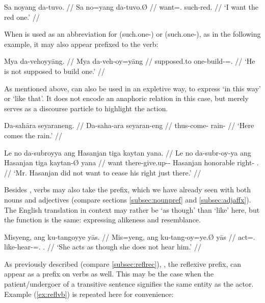 \ex\begingl
	\gla Sa noyang da-tuvo. //
	\glb Sa no=yang da-tuvo.Ø //
	\glc \PatT{} want=\Fsg{}.\Aarg{} such-red.\Top{} //
	\glft `I want the red one.' //
\endgl\xe

When  is used as an abbreviation for  
(such.one-\Parg{}) or  (such.one-\PargI{}), as in the 
following example, it may also appear prefixed to the verb:

\ex\begingl
	\gla Mya da-vehoyyāng. //
	\glb Mya da-veh-oy=yāng //
	\glc supposed.to one-build-\Neg{}=\Tsg.\M{} //
	\glft `He is not supposed to build one.' //
\endgl\xe

As mentioned above,  can also be used in an expletive way, to 
express `in this way' or `like that'. It does not encode an anaphoric relation 
in this case, but merely serves as a discourse particle to highlight the action.

\pex
\a\begingl
	\gla Da-sahāra seyaraneng. //
	\glb Da-saha-ara seyaran-eng //
	\glc thus-come-\TsgI{} rain-\AargI{} //
	\glft `Here comes the rain.' //
\endgl

\a\begingl
	\gla Le no da-subroyya ang Hasanjan tiga kaytan yana. //
	\glb Le no da-subr-oy-ya ang Hasanjan tiga kaytan-Ø yana //
	\glc \PatT{} want there-give.up-\Neg{}-\TsgM{} \Aarg{} Hasanjan 
		honorable right-\Top{} \TsgM{}.\Gen{} //
	\glft `Mr. Hasanjan did not want to cease his right just there.' //
\endgl

\xe

Besides , verbs may also take the  prefix, 
which we have already seen with both nouns and adjectives (compare sections 
\ref{subsec:nounpref} and \ref{subsec:adjaffx}). The English translation in 
context may rather be `as though' than `like' here, but the function is the 
same: expressing alikeness and resemblance.

\ex\begingl
	\gla Misyeng, ang ku-tangoyye yās. //
	\glb Mis=yeng, ang ku-tang-oy=ye.Ø yās //
	\glc act=\TsgF{}.\Aarg{} \AgtT{} like-hear-\Neg{}=\TsgF{}.\Top{} 
		\TsgM{}.\Parg{} //
	\glft `She acts as though she does not hear him.' //
\endgl\xe

As previously described (compare \autoref{subsec:reflrec}), 
, the reflexive prefix, can appear as a prefix on 
verbs as well. This may be the case when the patient/undergoer of a 
transitive sentence signifies the same entity as the actor. Example 
(\ref{ex:reflvb}) is repeated here for convenience:

